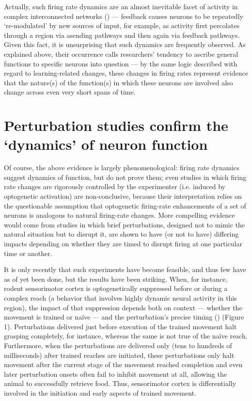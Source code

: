 \begin{refsection}
Actually, such firing rate dynamics are an almost inevitable facet of activity in complex interconnected networks (\cite{pandarinath2018a,yuste2015a}) — feedback causes neurons to be repeatedly ‘re-modulated’ by new sources of input, for example, as activity first percolates through a region via asending pathways and then again via feedback pathways. Given this fact, it is unsurprising that such dynamics are frequently observed. As explained above, their occurrence calls researchers’ tendency to ascribe general functions to specific neurons into question — by the same logic described with regard to learning-related changes, these changes in firing rates represent evidence that the nature(s) of the function(s) in which these neurons are involved also change across even very short spans of time.

\section{Perturbation studies confirm the ‘dynamics’ of neuron function}
Of course, the above evidence is largely phenomenological: firing rate dynamics suggest dynamics of function, but do not prove them; even studies in which firing rate changes are rigorously controlled by the experimenter (i.e. induced by optogenetic activation) are non-conclusive, because their interpretation relies on the questionable assumption that optogenetic firing-rate enhancements of a set of neurons is analogous to natural firing-rate changes. More compelling evidence would come from studies in which brief perturbations, designed not to mimic the natural situation but to disrupt it, are shown to have (or not to have) differing impacts depending on whether they are timed to disrupt firing at one particular time or another.

It is only recently that such experiments have become feasible, and thus few have as of yet been done, but the results have been striking. When, for instance, rodent sensorimotor cortex is optogenetically suppressed before or during a complex reach (a behavior that involves highly dynamic neural activity in this region), the impact of that suppression depends both on context — whether the movement is trained or naïve — and the perturbation’s precise timing (\cite{guo2015a}) (Figure 1). Perturbations delivered just before execution of the trained movement halt grasping completely, for instance, whereas the same is not true of the naïve reach. Furthermore, when the perturbations are delivered only (tens to hundreds of milliseconds) after trained reaches are initiated, these perturbations only halt movement after the current stage of the movement reached completion and even later perturbation onsets often fail to inhibit movement at all, allowing the animal to successfully retrieve food. Thus, sensorimotor cortex is differentially involved in the initiation and early aspects of trained movement.


\end{refsection}
